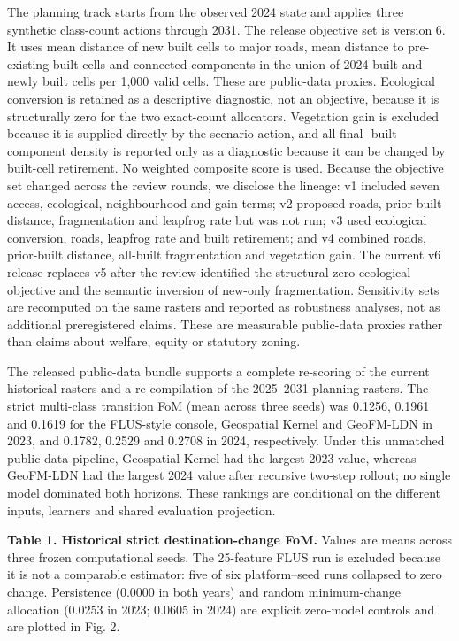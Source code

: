\documentclass[
]{article}
\begin{document}
The planning track starts from the observed 2024 state and applies three
synthetic class-count actions through 2031. The release objective set is
version 6. It uses mean distance of new built cells to major roads, mean
distance to pre-existing built cells and connected components in the
union of 2024 built and newly built cells per 1,000 valid cells. These
are public-data proxies. Ecological conversion is retained as a
descriptive diagnostic, not an objective, because it is structurally
zero for the two exact-count allocators. Vegetation gain is excluded
because it is supplied directly by the scenario action, and all-final-
built component density is reported only as a diagnostic because it can
be changed by built-cell retirement. No weighted composite score is
used. Because the objective set changed across the review rounds, we
disclose the lineage: v1 included seven access, ecological,
neighbourhood and gain terms; v2 proposed roads, prior-built distance,
fragmentation and leapfrog rate but was not run; v3 used ecological
conversion, roads, leapfrog rate and built retirement; and v4 combined
roads, prior-built distance, all-built fragmentation and vegetation
gain. The current v6 release replaces v5 after the review identified the
structural-zero ecological objective and the semantic inversion of
new-only fragmentation. Sensitivity sets are recomputed on the same
rasters and reported as robustness analyses, not as additional
preregistered claims. These are measurable public-data proxies rather
than claims about welfare, equity or statutory zoning.

The released public-data bundle supports a complete re-scoring of the
current historical rasters and a re-compilation of the 2025--2031
planning rasters. The strict multi-class transition FoM (mean across
three seeds) was 0.1256, 0.1961 and 0.1619 for the FLUS-style console,
Geospatial Kernel and GeoFM-LDN in 2023, and 0.1782, 0.2529 and 0.2708
in 2024, respectively. Under this unmatched public-data pipeline,
Geospatial Kernel had the largest 2023 value, whereas GeoFM-LDN had the
largest 2024 value after recursive two-step rollout; no single model
dominated both horizons. These rankings are conditional on the different
inputs, learners and shared evaluation projection.

\textbf{Table 1. Historical strict destination-change FoM.} Values are
means across three frozen computational seeds. The 25-feature FLUS run
is excluded because it is not a comparable estimator: five of six
platform--seed runs collapsed to zero change. Persistence (0.0000 in
both years) and random minimum-change allocation (0.0253 in 2023; 0.0605
in 2024) are explicit zero-model controls and are plotted in Fig. 2.
\end{document}
